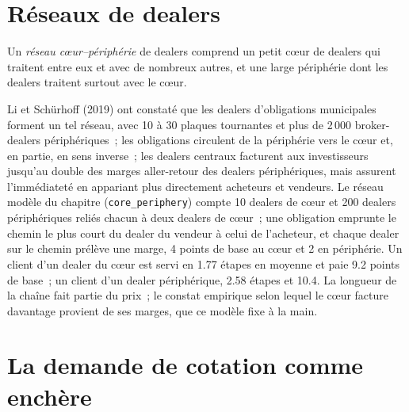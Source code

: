 \section{Réseaux de dealers}

\begin{definition}\label{def:mx:request-for-quote-and-dealer-markets-in-theory:cp}
Un \emph{réseau cœur--périphérie} de dealers comprend un petit cœur de dealers qui traitent entre eux et avec de nombreux autres,
et une large périphérie dont les dealers traitent surtout avec le cœur.
\end{definition}

Li et Schürhoff (2019) ont constaté que les dealers d'obligations municipales forment un tel réseau, avec 10 à 30 plaques tournantes et plus de 2\,000 broker-dealers périphériques~; les obligations circulent
de la périphérie vers le cœur et, en partie, en sens inverse~; les dealers centraux facturent aux investisseurs jusqu'au double des marges aller-retour des dealers périphériques, mais assurent l'immédiateté en
appariant plus directement acheteurs et vendeurs. Le réseau modèle du chapitre (\texttt{core\_periphery}) compte 10 dealers de cœur et 200 dealers périphériques
reliés chacun à deux dealers de cœur~; une obligation emprunte le chemin le plus court du dealer du vendeur à celui de l'acheteur, et chaque dealer sur le chemin
prélève une marge, 4 points de base au cœur et 2 en périphérie. Un client d'un dealer du cœur est servi en 1.77 étapes en moyenne et paie 9.2 points de
base~; un client d'un dealer périphérique, 2.58 étapes et 10.4. La longueur de la chaîne fait partie du prix~; le constat empirique selon lequel le cœur facture davantage
provient de ses marges, que ce modèle fixe à la main.

\section{La demande de cotation comme enchère}

